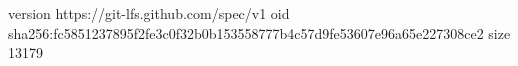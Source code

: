 version https://git-lfs.github.com/spec/v1
oid sha256:fc5851237895f2fe3c0f32b0b153558777b4c57d9fe53607e96a65e227308ce2
size 13179
